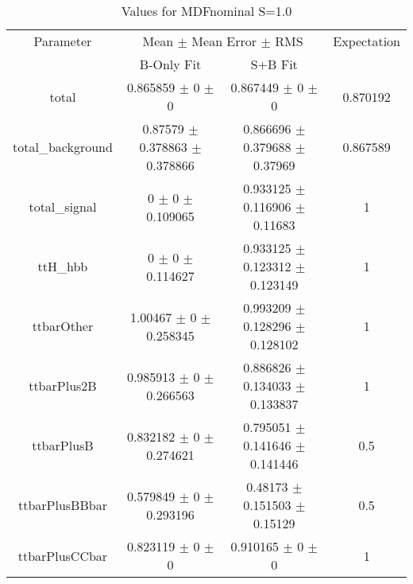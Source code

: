 \begin{table}
\centering
\caption{Values for MDFnominal S=1.0}
\begin{tabular}{cccc}
\toprule
Parameter & \multicolumn{2}{c}{Mean $\pm$ Mean Error $\pm$ RMS} & Expectation\\
 & B-Only Fit & S+B Fit & \\
\midrule
total & \num{0.865859} $\pm$ \num{0} $\pm$ \num{0} & \num{0.867449} $\pm$ \num{0} $\pm$ \num{0} & \num{0.870192}\\
total\_background & \num{0.87579} $\pm$ \num{0.378863} $\pm$ \num{0.378866} & \num{0.866696} $\pm$ \num{0.379688} $\pm$ \num{0.37969} & \num{0.867589}\\
total\_signal & \num{0} $\pm$ \num{0} $\pm$ \num{0.109065} & \num{0.933125} $\pm$ \num{0.116906} $\pm$ \num{0.11683} & \num{1}\\
ttH\_hbb & \num{0} $\pm$ \num{0} $\pm$ \num{0.114627} & \num{0.933125} $\pm$ \num{0.123312} $\pm$ \num{0.123149} & \num{1}\\
ttbarOther & \num{1.00467} $\pm$ \num{0} $\pm$ \num{0.258345} & \num{0.993209} $\pm$ \num{0.128296} $\pm$ \num{0.128102} & \num{1}\\
ttbarPlus2B & \num{0.985913} $\pm$ \num{0} $\pm$ \num{0.266563} & \num{0.886826} $\pm$ \num{0.134033} $\pm$ \num{0.133837} & \num{1}\\
ttbarPlusB & \num{0.832182} $\pm$ \num{0} $\pm$ \num{0.274621} & \num{0.795051} $\pm$ \num{0.141646} $\pm$ \num{0.141446} & \num{0.5}\\
ttbarPlusBBbar & \num{0.579849} $\pm$ \num{0} $\pm$ \num{0.293196} & \num{0.48173} $\pm$ \num{0.151503} $\pm$ \num{0.15129} & \num{0.5}\\
ttbarPlusCCbar & \num{0.823119} $\pm$ \num{0} $\pm$ \num{0} & \num{0.910165} $\pm$ \num{0} $\pm$ \num{0} & \num{1}\\
\bottomrule
\end{tabular}
\end{table}